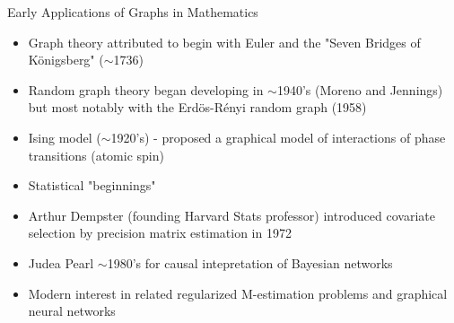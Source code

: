 \documentclass{beamer}
\begin{document}
\begin{frame}{Early Applications of Graphs in Mathematics}
    \begin{itemize}
        \item Graph theory attributed to begin with Euler and the "Seven Bridges of K\"onigsberg" ($\sim$1736)
        \item Random graph theory began developing in $\sim$1940's (Moreno and Jennings) but most notably with the Erd\"os-R\'enyi random graph (1958)
        \item Ising model ($\sim$1920's) - proposed a graphical model of interactions of phase transitions (atomic spin)
        \item Statistical "beginnings"%
        \item Arthur Dempster (founding Harvard Stats professor) introduced covariate selection by precision matrix estimation in 1972 \cite{dempster_covariance_1972}
        \item Judea Pearl $\sim$1980's for causal intepretation of Bayesian networks
        \item Modern interest in related regularized M-estimation problems and graphical neural networks 
    \end{itemize}
    \end{frame}
\end{document}
